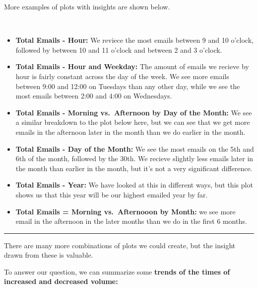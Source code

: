\documentclass[11pt]{article}
\providecommand{\tightlist}{%
      \setlength{\itemsep}{0pt}\setlength{\parskip}{0pt}}
\begin{document}
    More examples of plots with insights are shown below.

   
    \begin{center}
    \end{center}
    { \hspace*{\fill} \\}
    
    \begin{itemize}
\tightlist
\item
  \textbf{Total Emails - Hour:} We reviece the most emails between 9 and
  10 o'clock, followed by between 10 and 11 o'clock and between 2 and 3
  o'clock.
\item
  \textbf{Total Emails - Hour and Weekday:} The amount of emails we
  recieve by hour is fairly constant across the day of the week. We see
  more emails between 9:00 and 12:00 on Tuesdays than any other day,
  while we see the most emails between 2:00 and 4:00 on Wednesdays.
\item
  \textbf{Total Emails - Morning vs.~Afternoon by Day of the Month:} We
  see a similar breakdown to the plot below here, but we can see that we
  get more emails in the afternoon later in the month than we do earlier
  in the month.
\item
  \textbf{Total Emails - Day of the Month:} We see the most emails on
  the 5th and 6th of the month, followed by the 30th. We recieve
  slightly less emails later in the month than earlier in the month, but
  it's not a very significant difference.
\item
  \textbf{Total Emails - Year:} We have looked at this in different
  ways, but this plot shows us that this year will be our highest
  emailed year by far.
\item
  \textbf{Total Emails = Morning vs.~Afternooon by Month:} we see more
  email in the afternoon in the later months than we do in the first 6
  months.
\end{itemize}

    \begin{center}\rule{0.5\linewidth}{0.5pt}\end{center}

There are many more combinations of plots we could create, but the
insight drawn from these is valuable.

To answer our question, we can summarize some \textbf{trends of the
times of increased and decreased volume:}
\end{document}
